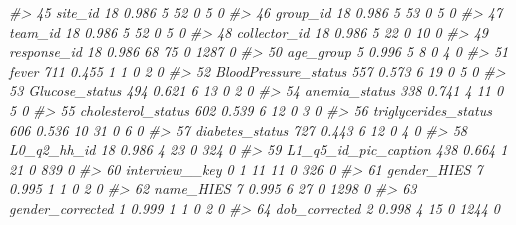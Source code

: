 \documentclass[]{article}
\newenvironment{Shaded}{\begin{snugshade}}{\end{snugshade}}
\newcommand{\CommentTok}[1]{\textcolor[rgb]{0.56,0.35,0.01}{\textit{#1}}}
\begin{document}
\begin{Shaded}
\begin{Highlighting}[]
\CommentTok{#> 45 site_id                                                       18       0.986     5  52     0        5          0}
\CommentTok{#> 46 group_id                                                      18       0.986     5  53     0        5          0}
\CommentTok{#> 47 team_id                                                       18       0.986     5  52     0        5          0}
\CommentTok{#> 48 collector_id                                                  18       0.986     5  22     0       10          0}
\CommentTok{#> 49 response_id                                                   18       0.986    68  75     0     1287          0}
\CommentTok{#> 50 age_group                                                      5       0.996     5   8     0        4          0}
\CommentTok{#> 51 fever                                                        711       0.455     1   1     0        2          0}
\CommentTok{#> 52 BloodPressure_status                                         557       0.573     6  19     0        5          0}
\CommentTok{#> 53 Glucose_status                                               494       0.621     6  13     0        2          0}
\CommentTok{#> 54 anemia_status                                                338       0.741     4  11     0        5          0}
\CommentTok{#> 55 cholesterol_status                                           602       0.539     6  12     0        3          0}
\CommentTok{#> 56 triglycerides_status                                         606       0.536    10  31     0        6          0}
\CommentTok{#> 57 diabetes_status                                              727       0.443     6  12     0        4          0}
\CommentTok{#> 58 L0_q2_hh_id                                                   18       0.986     4  23     0      324          0}
\CommentTok{#> 59 L1_q5_id_pic_caption                                         438       0.664     1  21     0      839          0}
\CommentTok{#> 60 interview__key                                                 0       1        11  11     0      326          0}
\CommentTok{#> 61 gender_HIES                                                    7       0.995     1   1     0        2          0}
\CommentTok{#> 62 name_HIES                                                      7       0.995     6  27     0     1298          0}
\CommentTok{#> 63 gender_corrected                                               1       0.999     1   1     0        2          0}
\CommentTok{#> 64 dob_corrected                                                  2       0.998     4  15     0     1244          0}

\end{Highlighting}
\end{Shaded}
\end{document}
